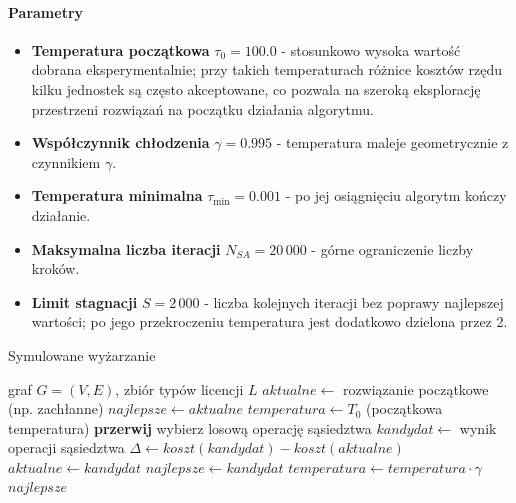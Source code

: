 \paragraph{Parametry}
\begin{itemize}
  \item \textbf{Temperatura początkowa} $\tau_0 = 100.0$ - stosunkowo wysoka wartość dobrana eksperymentalnie; przy takich temperaturach różnice kosztów rzędu kilku jednostek są często akceptowane, co pozwala na szeroką eksplorację przestrzeni rozwiązań na początku działania algorytmu.
  \item \textbf{Współczynnik chłodzenia} $\gamma = 0.995$ - temperatura maleje geometrycznie z czynnikiem $\gamma$.
  \item \textbf{Temperatura minimalna} $\tau_{\min} = 0.001$ - po jej osiągnięciu algorytm kończy działanie.
  \item \textbf{Maksymalna liczba iteracji} $N_{SA} = 20\,000$ - górne ograniczenie liczby kroków.
  \item \textbf{Limit stagnacji} $S = 2\,000$ - liczba kolejnych iteracji bez poprawy najlepszej wartości; po jego przekroczeniu temperatura jest dodatkowo dzielona przez 2.
\end{itemize}

\begin{algorithm}[H]
  \caption{Symulowane wyżarzanie}
  \label{alg:sa}
  \begin{algorithmic}[1]
    \Require graf $G=(V,E)$, zbiór typów licencji $L$
    \State $aktualne \gets$ rozwiązanie początkowe (np. zachłanne)
    \State $najlepsze \gets aktualne$
    \State $temperatura \gets T_0$ (początkowa temperatura)
     \textbf{przerwij} \EndIf
    \State wybierz losową operację sąsiedztwa
    \State $kandydat \gets$ wynik operacji sąsiedztwa
    \State $\Delta \gets koszt(kandydat) - koszt(aktualne)$
    \State $aktualne \gets kandydat$
    \State $najlepsze \gets kandydat$
    \EndIf
    \EndIf
    \State $temperatura \gets temperatura \cdot \gamma$
    \EndFor
    \State \Return $najlepsze$
  \end{algorithmic}
\end{algorithm}

